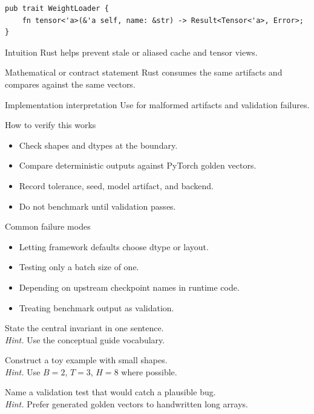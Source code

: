 \begin{lstlisting}[caption={Rust loader trait sketch.}]
pub trait WeightLoader {
    fn tensor<'a>(&'a self, name: &str) -> Result<Tensor<'a>, Error>;
}
\end{lstlisting}

\begin{intuitionbox}{Intuition}
Rust helps prevent stale or aliased cache and tensor views.
\end{intuitionbox}

\begin{definitionbox}{Mathematical or contract statement}
Rust consumes the same artifacts and compares against the same vectors.
\end{definitionbox}

\begin{implementationbox}{Implementation interpretation}
Use  for malformed artifacts and validation failures.
\end{implementationbox}

\begin{verificationbox}{How to verify this works}
\begin{itemize}
\item Check shapes and dtypes at the boundary.
\item Compare deterministic outputs against PyTorch golden vectors.
\item Record tolerance, seed, model artifact, and backend.
\item Do not benchmark until validation passes.
\end{itemize}
\end{verificationbox}

\begin{warningbox}{Common failure modes}
\begin{itemize}
\item Letting framework defaults choose dtype or layout.
\item Testing only a batch size of one.
\item Depending on upstream checkpoint names in runtime code.
\item Treating benchmark output as validation.
\end{itemize}
\end{warningbox}

\begin{chapterexercises}
\item State the central invariant in one sentence.\\
\textit{Hint.} Use the conceptual guide vocabulary.
\item Construct a toy example with small shapes.\\
\textit{Hint.} Use $B=2$, $T=3$, $H=8$ where possible.
\item Name a validation test that would catch a plausible bug.\\
\textit{Hint.} Prefer generated golden vectors to handwritten long arrays.
\end{chapterexercises}

